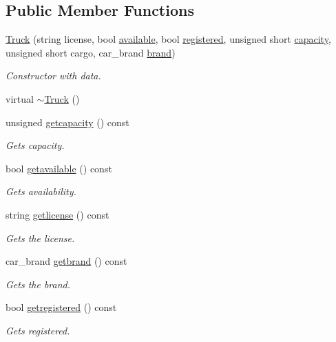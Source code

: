 \subsection*{Public Member Functions}
\begin{DoxyCompactItemize}
\item 
\hyperlink{class_truck_a9b3cc0181f1368df53aec583fb63f096}{Truck} (string license, bool \hyperlink{class_truck_a4189fe5ed32f6084459a9c5ae1eb7c2a}{available}, bool \hyperlink{class_truck_a80b8405cf7a15b236fef70116f99c4fb}{registered}, unsigned short \hyperlink{class_truck_ab004524786ae7aebf7c7bdb5e1599696}{capacity}, unsigned short cargo, car\+\_\+brand \hyperlink{class_truck_a4e30b27a9898eba7ac8404d25cbdd265}{brand})
\begin{DoxyCompactList}\small\item\em Constructor with data. \end{DoxyCompactList}\item 
virtual \hyperlink{class_truck_afe887186d0490451a8ce4a3ef433dee3}{$\sim$\+Truck} ()
\item 
unsigned \hyperlink{class_truck_ab8c3a335924da7d2c36c4c5ba4510db0}{getcapacity} () const
\begin{DoxyCompactList}\small\item\em Gets capacity. \end{DoxyCompactList}\item 
bool \hyperlink{class_truck_a0eaa329bc72bf0171f7ec2a0a6240156}{getavailable} () const
\begin{DoxyCompactList}\small\item\em Gets availability. \end{DoxyCompactList}\item 
string \hyperlink{class_truck_ae76a7ae2343557680ae915c6c6d42ff8}{getlicense} () const
\begin{DoxyCompactList}\small\item\em Gets the license. \end{DoxyCompactList}\item 
car\+\_\+brand \hyperlink{class_truck_aef2b55646cc09f3f2ab21dd4e51ef214}{getbrand} () const
\begin{DoxyCompactList}\small\item\em Gets the brand. \end{DoxyCompactList}\item 
bool \hyperlink{class_truck_a830838ed22465cf27f56b911c3fadf13}{getregistered} () const
\begin{DoxyCompactList}\small\item\em Gets registered. \end{DoxyCompactList}\item 

\end{DoxyCompactItemize}
